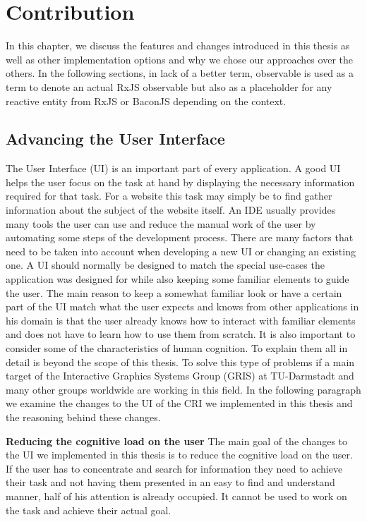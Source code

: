 \chapter{Contribution}
\label{ch:Contribution}
In this chapter, we discuss the features and changes introduced in this thesis as well as other implementation options and why we chose our approaches over the others. In the following sections, in lack of a better term, observable is used as a term to denote an actual RxJS observable but also as a placeholder for any reactive entity from RxJS or BaconJS depending on the context.

\section{Advancing the User Interface}
The User Interface (UI) is an important part of every application. A good UI helps the user focus on the task at hand by displaying the necessary information required for that task. For a website this task may simply be to find gather information about the subject of the website itself. An IDE usually provides many tools the user can use and reduce the manual work of the user by automating some steps of the development process. There are many factors that need to be taken into account when developing a new UI or changing an existing one. A UI should normally be designed to match the special use-cases the application was designed for while also keeping some familiar elements to guide the user. The main reason to keep a somewhat familiar look or have a certain part of the UI match what the user expects and knows from other applications in his domain is that the user already knows how to interact with familiar elements and does not have to learn how to use them from scratch. It is also important to consider some of the characteristics of human cognition. To explain them all in detail is beyond the scope of this thesis. To solve this type of problems if a main target of the Interactive Graphics Systems Group (GRIS) at TU-Darmstadt and many other groups worldwide are working in this field. In the following paragraph we examine the changes to the UI of the CRI we implemented in this thesis and the reasoning behind these changes.
  
\textbf{Reducing the cognitive load on the user}
The main goal of the changes to the UI we implemented in this thesis is to reduce the cognitive load on the user. If the user has to concentrate and search for information they need to achieve their task and not having them presented in an easy to find and understand manner, half of his attention is already occupied. It cannot be used to work on the task and achieve their actual goal.


